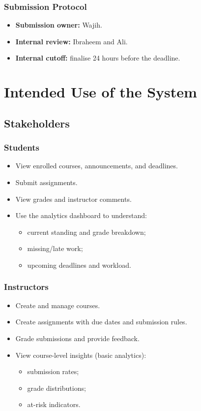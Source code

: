 \documentclass[12pt, a4paper]{article}
\begin{document}
\subsubsection*{Submission Protocol}
\begin{itemize}
  \item \textbf{Submission owner:} Wajih.
  \item \textbf{Internal review:} Ibraheem and Ali.
  \item \textbf{Internal cutoff:} finalise 24 hours before the deadline.
\end{itemize}

\section{Intended Use of the System}

\subsection{Stakeholders}

\subsubsection*{Students}
\begin{itemize}
  \item View enrolled courses, announcements, and deadlines.
  \item Submit assignments.
  \item View grades and instructor comments.
  \item Use the analytics dashboard to understand:
    \begin{itemize}
      \item current standing and grade breakdown;
      \item missing/late work;
      \item upcoming deadlines and workload.
    \end{itemize}
\end{itemize}

\subsubsection*{Instructors}
\begin{itemize}
  \item Create and manage courses.
  \item Create assignments with due dates and submission rules.
  \item Grade submissions and provide feedback.
  \item View course-level insights (basic analytics):
    \begin{itemize}
      \item submission rates;
      \item grade distributions;
      \item at-risk indicators.
    \end{itemize}
\end{itemize}
\end{document}

